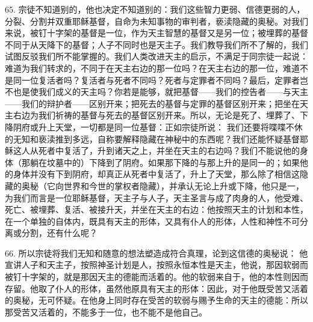65. 宗徒不知道别的，他也决定不知道别的：我们这些智力更弱、信德更弱的人，分裂、分割并双重耶稣基督，自命为未知事物的审判者，亵渎隐藏的奥秘。对我们来说，被钉十字架的基督是一位，作为天主智慧的基督又是另一位；被埋葬的基督不同于从天降下的基督；人子不同时也是天主子。我们教导我们所不了解的，我们试图反驳我们所不能掌握的。我们人类改进天主的启示，不满足于同宗徒一起说： 难道为我们转求的，不同于在天主右边的那一位吗？在天主右边的那一位，难道不是同一位复活者吗？复活者与死者不同吗？死者与定罪者不同吗？最后，定罪者岂不也是使我们成义的天主吗？你若是能够，就把基督——我们的控告者——与天主——我们的辩护者——区别开来；把死去的基督与定罪的基督区别开来；把坐在天主右边为我们祈祷的基督与死去的基督区别开来。所以，无论是死了、埋葬了、下降阴府或升上天堂，一切都是同一位基督：正如宗徒所说： 我们还要将喋喋不休的无知和亵渎推到多远，自称要解释隐藏在神秘中的东西呢？我们还能怀疑基督耶稣这人从死者中复活了，升到诸天之上，并坐在天主的右边吗？我们不能说他的身体（那躺在坟墓中的）下降到了阴府。如果那下降的与那上升的是同一的；如果他的身体并没有下到阴府，却真正从死者中复活了，升上了天堂，那么除了相信这隐藏的奥秘（它向世界和今世的掌权者隐藏），并承认无论上升或下降，他只是一，为我们而言是一位耶稣基督，天主子与人子，天主圣言与成了肉身的人，他受难、死亡、被埋葬、复活、被接升天，并坐在天主的右边：他按照天主的计划和本性，在一个单独的自体内，既具有天主的形体，又具有仆人的形体，人性和神性不可分离或分割，还有什么呢？\par

66. 所以宗徒将我们无知和随意的想法塑造成符合真理，论到这信德的奥秘说： 他宣讲人子和天主子，按照神圣计划是人，按照永恒本性是天主，他说，那因软弱而被钉十字架的，就是那因天主的德能而活着的。他的软弱来自于，他的本性则因而存留。他取了仆人的形体，虽然他原具有天主的形体：因此，对于他既受苦又活着的奥秘，无可怀疑。在他身上同时存在受苦的软弱与赐予生命的天主的德能：所以那受苦又活着的，不能多于一位，也不能不是他自己。\par

